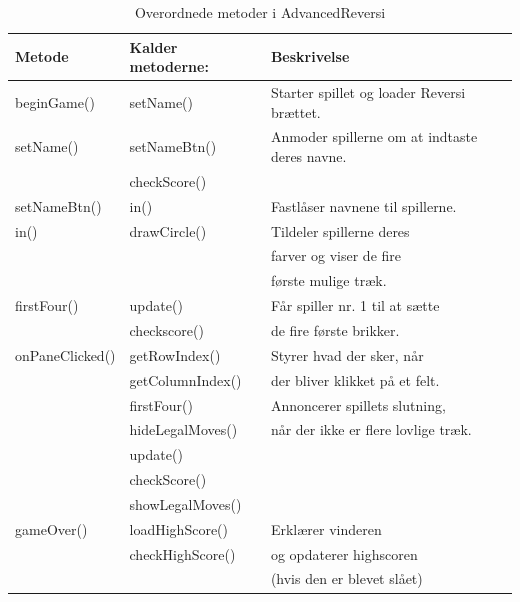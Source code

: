 \begin{table}[H]
    \centering
    \caption{Overordnede metoder i AdvancedReversi}\label{tbl:}
    \begin{tabular}{lll}
        \toprule
        Metode          & Kalder metoderne: & Beskrivelse                                   \\
        \midrule
        beginGame()     & setName()         & Starter spillet og loader Reversi brættet.    \\
        setName()       & setNameBtn()      & Anmoder spillerne om at indtaste deres navne. \\
                        & checkScore()      &                                               \\
        setNameBtn()    & in()              & Fastlåser navnene til spillerne.              \\
        in()            & drawCircle()      & Tildeler spillerne deres                      \\
                        &                   & farver og viser de fire                       \\
                        &                   & første mulige træk.                           \\
        firstFour()     & update()          & Får spiller nr. 1 til at sætte                \\
                        & checkscore()      & de fire første brikker.                       \\
        onPaneClicked() & getRowIndex()     & Styrer hvad der sker, når                     \\
                        & getColumnIndex()  & der bliver klikket på et felt.                \\
                        & firstFour()       & Annoncerer spillets slutning,                 \\
                        & hideLegalMoves()  & når der ikke er flere lovlige træk.           \\
                        & update()          &                                               \\
                        & checkScore()      &                                               \\
                        & showLegalMoves()  &                                               \\
        gameOver()      & loadHighScore()   & Erklærer vinderen                             \\
                        & checkHighScore()  & og opdaterer highscoren                       \\
                        &                   & (hvis den er blevet slået)                    \\
        \bottomrule
    \end{tabular}
\end{table}
